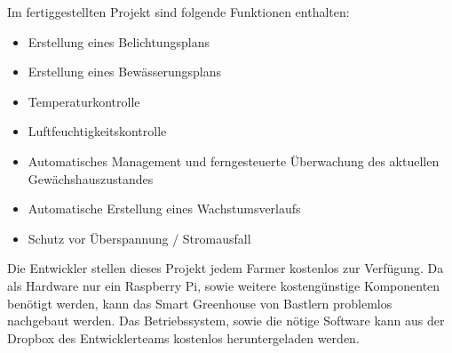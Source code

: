 Im fertiggestellten Projekt sind folgende Funktionen enthalten:\\

\begin{itemize} 
	\item Erstellung eines Belichtungsplans
	\item Erstellung eines Bewässerungsplans
	\item Temperaturkontrolle
	\item Luftfeuchtigkeitskontrolle
	\item Automatisches Management und ferngesteuerte Überwachung des aktuellen Gewächshauszustandes
	\item Automatische Erstellung eines Wachstumsverlaufs
	\item Schutz vor Überspannung / Stromausfall
\end{itemize}

Die Entwickler stellen dieses Projekt jedem Farmer kostenlos zur Verfügung. Da als Hardware nur ein Raspberry Pi, sowie weitere kostengünstige Komponenten benötigt werden, kann das Smart Greenhouse von Bastlern problemlos nachgebaut werden.
Das Betriebssystem, sowie die nötige Software kann aus der Dropbox des Entwicklerteams kostenlos heruntergeladen werden\cite{z:smartgreenhouse}.
